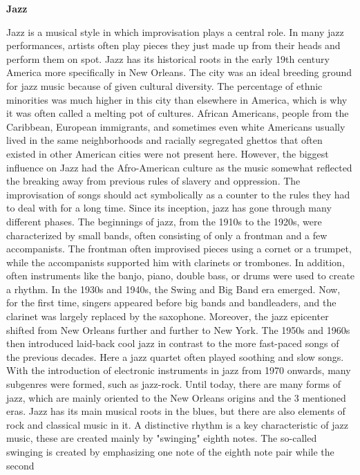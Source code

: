 \textbf{Jazz}

Jazz is a musical style in which improvisation plays a central role.
In many jazz performances, artists often play pieces they just made up from their heads and
perform them on spot.
Jazz has its historical roots in the early 19th century America more specifically in New Orleans.
The city was an ideal breeding ground for jazz music because of given cultural diversity.
The percentage of ethnic minorities was much higher in this city than elsewhere in America,
which is why it was often called a melting pot of cultures. African Americans, people from the Caribbean,
European immigrants, and sometimes even white Americans usually lived in the same neighborhoods and racially
segregated ghettos that often existed in other American cities were not present here.\cite{Beek2021Jazz}
However, the biggest influence on Jazz had the Afro-American culture as the music somewhat
reflected the breaking away from previous rules of slavery and oppression.
The improvisation of songs should act symbolically as a counter to the rules they had to deal with for a
long time.
Since its inception, jazz has gone through many different phases.
The beginnings of jazz, from the 1910s to the 1920s, were characterized by small bands,
often consisting of only a frontman and a few accompanists.
The frontman often improvised pieces using a cornet or a trumpet,
while the accompanists supported him with clarinets or trombones.
In addition, often instruments like the banjo, piano, double bass, or drums were used to create a rhythm.
In the 1930s and 1940s, the Swing and Big Band era emerged.
Now, for the first time, singers appeared before big bands and bandleaders,
and the clarinet was largely replaced by the saxophone.
Moreover, the jazz epicenter shifted from New Orleans further and further to New York.\cite{Wildridge2020}
The 1950s and 1960s then introduced laid-back cool jazz in contrast to the more fast-paced songs
of the previous decades.
Here a jazz quartet often played soothing and slow songs. With the introduction of electronic
instruments in jazz from 1970 onwards, many subgenres were formed, such as jazz-rock.
Until today, there are many forms of jazz, which are mainly oriented to the New Orleans origins
and the 3 mentioned eras.
Jazz has its main musical roots in the blues, but there are also elements of rock and classical music in it.\cite{JazzAmHistory}
A distinctive rhythm is a key characteristic of jazz music,
these are created mainly by "swinging" eighth notes.
The so-called swinging is created by emphasizing one note of the eighth note pair while the second

